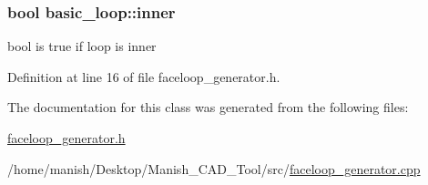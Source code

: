 \subsubsection[{\texorpdfstring{inner}{inner}}]{\setlength{\rightskip}{0pt plus 5cm}bool basic\+\_\+loop\+::inner}\hypertarget{classbasic__loop_a79ff39c7f385ef03176dca8c675844fe}{}\label{classbasic__loop_a79ff39c7f385ef03176dca8c675844fe}


bool is true if loop is inner 



Definition at line 16 of file faceloop\+\_\+generator.\+h.



The documentation for this class was generated from the following files\+:\begin{DoxyCompactItemize}
\item 
\hyperlink{faceloop__generator_8h}{faceloop\+\_\+generator.\+h}\item 
/home/manish/\+Desktop/\+Manish\+\_\+\+C\+A\+D\+\_\+\+Tool/src/\hyperlink{faceloop__generator_8cpp}{faceloop\+\_\+generator.\+cpp}\end{DoxyCompactItemize}
